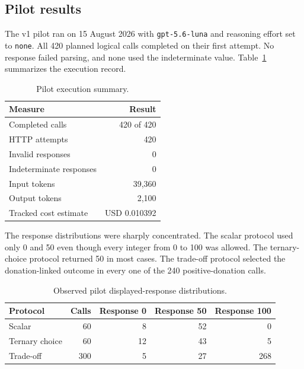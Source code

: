 \subsection{Pilot results}

The v1 pilot ran on 15 August 2026 with \texttt{gpt-5.6-luna} and
reasoning effort set to \texttt{none}. All 420 planned logical calls
completed on their first attempt. No response failed parsing, and none
used the indeterminate value. Table~\ref{tab:pilot-execution} summarizes
the execution record.

\begin{table}[htbp]
\centering
\caption{Pilot execution summary.}
\label{tab:pilot-execution}
\begin{tabular}{lr}
\hline
Measure & Result \\
\hline
Completed calls & 420 of 420 \\
HTTP attempts & 420 \\
Invalid responses & 0 \\
Indeterminate responses & 0 \\
Input tokens & 39,360 \\
Output tokens & 2,100 \\
Tracked cost estimate & USD 0.010392 \\
\hline
\end{tabular}
\end{table}

The response distributions were sharply concentrated. The scalar
protocol used only 0 and 50 even though every integer from 0 to 100 was
allowed. The ternary-choice protocol returned 50 in most cases. The
trade-off protocol selected the donation-linked outcome in every one of
the 240 positive-donation calls.

\begin{table}[htbp]
\centering
\caption{Observed pilot displayed-response distributions.}
\label{tab:pilot-responses}
\begin{tabular}{lrrrr}
\hline
Protocol & Calls & Response 0 & Response 50 & Response 100 \\
\hline
Scalar & 60 & 8 & 52 & 0 \\
Ternary choice & 60 & 12 & 43 & 5 \\
Trade-off & 300 & 5 & 27 & 268 \\
\hline
\end{tabular}
\end{table}


